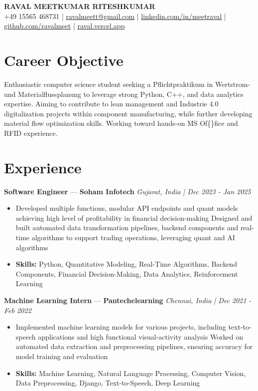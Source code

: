 \documentclass[a4paper,10pt]{article}
\begin{document}
\begin{center}
  {\Large\bfseries RAVAL MEETKUMAR RITESHKUMAR}\\[2pt]
  {\small +49 15565 468731 \;|\; \href{mailto:ravalmeett@gmail.com}{ravalmeett@gmail.com} \;|\; \href{https://www.linkedin.com/in/meetraval/}{linkedin.com/in/meetraval} \;|\; \href{https://github.com/ravalmeet}{github.com/ravalmeet} \;|\; \href{https://raval.vercel.app/}{raval.vercel.app}}
\end{center}
\vspace{-3pt}

\section*{Career Objective}
Enthusiastic computer science student seeking a Pflichtpraktikum in Wertstrom- und Materialflussplanung to leverage strong Python, C++, and data analytics expertise. Aiming to contribute to lean management and Industrie 4.0 digitalization projects within component manufacturing, while further developing material flow optimization skills. Working toward hands-on MS Of\{\}fice and RFID experience.\par

\section*{Experience}
\textbf{Software Engineer} — \textbf{Soham Infotech} \hfill \textit{Gujarat, India \;|\; Dec 2023 - Jan 2025}\par
\vspace{1pt}
\begin{itemize}
  \item Developed multiple functions, modular API endpoints and quant models achieving high level of profitability in financial decision-making Designed and built automated data transformation pipelines, backend components and real-time algorithms to support trading operations, leveraging quant and AI algorithms
  \item \textbf{Skills:} Python, Quantitative Modeling, Real-Time Algorithms, Backend Components, Financial Decision-Making, Data Analytics, Reinforcement Learning
\end{itemize}
\vspace{3pt}
\textbf{Machine Learning Intern} — \textbf{Pantechelearning} \hfill \textit{Chennai, India \;|\; Dec 2021 - Feb 2022}\par
\vspace{1pt}
\begin{itemize}
  \item Implemented machine learning models for various projects, including text-to-speech applications and high functional visual-activity analysis Worked on automated data extraction and preprocessing pipelines, ensuring accuracy for model training and evaluation
  \item \textbf{Skills:} Machine Learning, Natural Language Processing, Computer Vision, Data Preprocessing, Django, Text-to-Speech, Deep Learning
\end{itemize}
\end{document}
